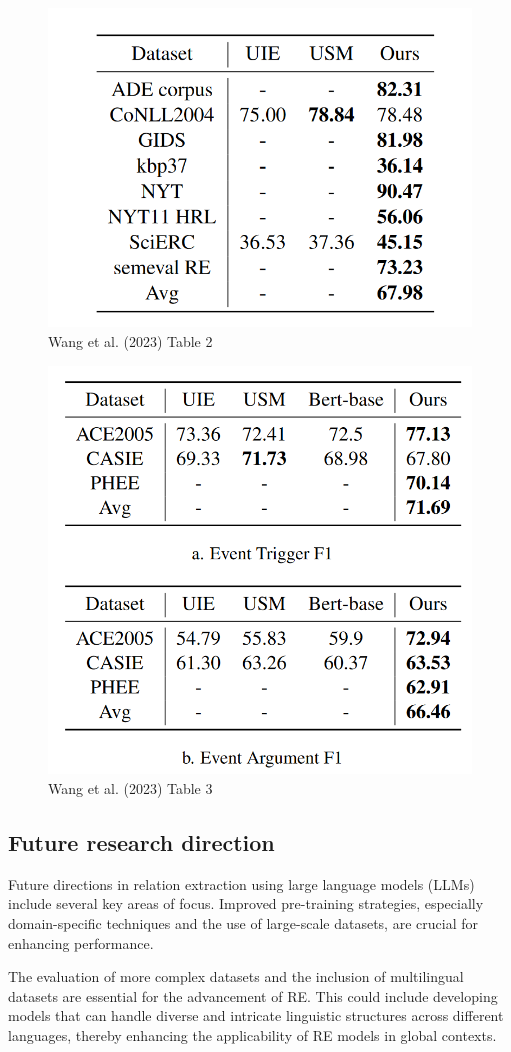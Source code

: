 \documentclass[twocolumn, 11pt]{extarticle}
\begin{document}
\begin{figure}
    \centering
    \includegraphics[width=0.75\linewidth]{InstructUIE_results.png}
    \caption{Wang et al. (2023)  Table 2}
    \label{Instruct UIE Results}
\end{figure}
\begin{figure}
    \centering
    \includegraphics[width=0.5\linewidth]{InstructUIE_results2.png}
    \caption{Wang et al. (2023)  Table 3}
    \label{Instruct UIE Results 2}
\end{figure}
\subsection{Future research direction}
Future directions in relation extraction using large language models (LLMs) include several key areas of focus. Improved pre-training strategies, especially domain-specific techniques and the use of large-scale datasets, are crucial for enhancing performance. 

The evaluation of more complex datasets and the inclusion of multilingual datasets are essential for the advancement of RE. This could include developing models that can handle diverse and intricate linguistic structures across different languages, thereby enhancing the applicability of RE models in global contexts.
\end{document}
